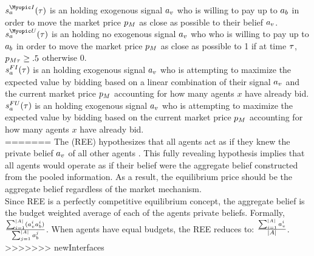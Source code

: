 $\AgentStrategy^{\Myopic\Informed}_\Agent(\Time)$ is an  holding exogenous signal $a_v$ who is willing to pay up to $a_b$ in order to move the market price $p_M$ as close as possible to their belief $a_v$. \\

$\AgentStrategy^{\Myopic\Uninformed}_\Agent(\Time)$ is an  holding no exogenous signal $a_v$ who who is willing to pay up to $a_b$ in order to move the market price $p_M$ as close as possible to 1 if at time $\tau$, $p_{M\tau} \ge .5$ otherwise 0. \\

$s^{FI}_a(\tau)$ is an holding exogenous signal $a_v$ who is attempting to maximize the expected value by bidding based on a linear combination of their signal $a_v$ and the current market price $p_M$ accounting for how many agents $x$ have already bid. \\

$s^{FU}_a(\tau)$ is an  holding exogenous signal $a_v$ who is attempting to maximize the expected value by bidding based on the current market price $p_M$ accounting for how many agents $x$ have already bid. \\
=======
The  (REE) hypothesizes that all agents act as if they knew the private belief $a_v$ of all other agents \cite{10.2307/1911360}. This fully revealing hypothesis implies that all agents would operate as if their belief were the aggregate belief constructed from the pooled information. As a result, the equilibrium price should be the aggregate belief regardless of the market mechanism.\\

Since REE is a perfectly competitive equilibrium concept, the aggregate belief is the budget weighted average of each of the agents private beliefs. Formally, $\frac{\sum_{i=1}^{|A|} (a^{i}_{v} a^{i}_{b})}{\sum_{j=1}^{|A|} a^{j}_{b}}$. When agents have equal budgets, the REE reduces to: $\frac{\sum_{i=1}^{|A|} a^{i}_{v}}{|A|}$.\\
>>>>>>> newInterfaces
